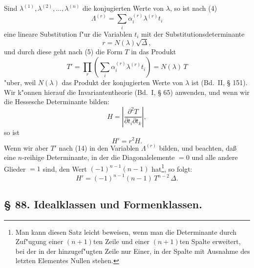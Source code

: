\documentclass[12pt,a4paper]{article}
\theoremstyle{plain}
\begin{document}
Sind $\lambda^{(1)}, \lambda^{(2)}, \ldots, \lambda^{(n)}$ die konjugierten Werte von $\lambda$, so ist nach (4)
\begin{equation}
\Lambda^{(r)} = \sum_{i} \alpha_i^{(r)} \lambda^{(r)} t_i
\tag{12}
\end{equation}
eine lineare Substitution f"ur die Variablen $t_i$ mit der Substitutionsdeterminante
\begin{equation}
r = N(\lambda) \sqrt{\Delta},
\tag{13}
\end{equation}
und durch diese geht nach (5) die Form $T$ in das Produkt
\begin{equation}
T' = \prod_{r} \left(\sum_{i} \alpha_i^{(r)} \lambda^{(r)} t_i\right) = N(\lambda)\,T
\tag{14}
\end{equation}
"uber, weil $N(\lambda)$ das Produkt der konjugierten Werte von $\lambda$ ist (Bd.~II, \S{} 151). Wir k"onnen hierauf die Invariantentheorie (Bd.~I, \S{} 65) anwenden, und wenn wir die Hessesche Determinante bilden:
\begin{equation}
H = \left|\frac{\partial^2 T}{\partial t_i \partial t_k}\right|,
\tag{15}
\end{equation}
so ist
\begin{equation}
H' = r^2 H.
\tag{16}
\end{equation}
Wenn wir aber $T'$ nach (14) in den Variablen $\Lambda^{(r)}$ bilden, und beachten, da\ss{} eine $n$-reihige Determinante, in der die Diagonalelemente $= 0$ und alle andere Glieder $= 1$ sind, den Wert $(-1)^{n-1}(n-1)$ hat\footnote{Man kann diesen Satz leicht beweisen, wenn man die Determinante durch Zuf"ugung einer $(n+1)$ten Zeile und einer $(n+1)$ten Spalte erweitert, bei der in der hinzugef"ugten Zeile nur Einer, in der Spalte mit Ausnahme des letzten Elementes Nullen stehen.}, so folgt:
\begin{equation}
H' = (-1)^{n-1}(n-1)\,T^{n-2}\,\Delta.
\tag{17}
\end{equation}

\newpage
\subsection*{\S{} 88. Idealklassen und Formenklassen.}
\end{document}
